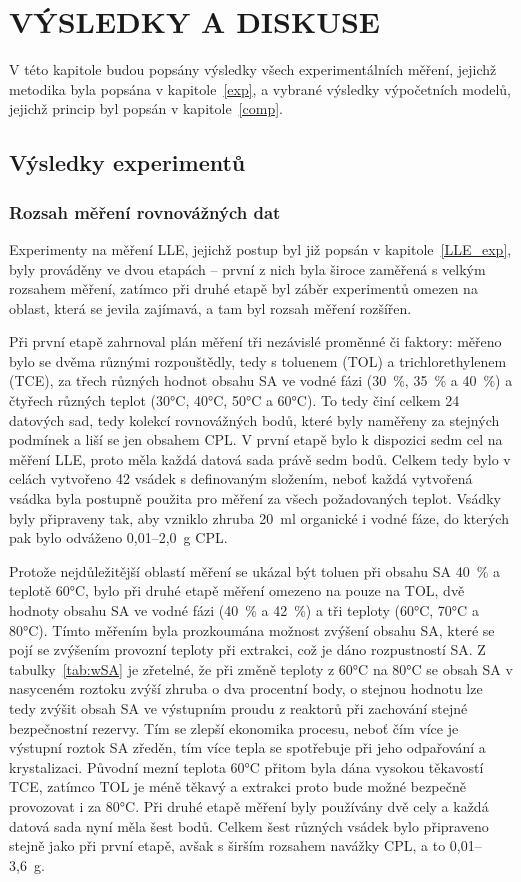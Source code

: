 
\newpage \section{VÝSLEDKY A DISKUSE} \label{res}
V této kapitole budou popsány výsledky všech experimentálních měření, jejichž metodika byla popsána v kapitole~\ref{exp}, a vybrané výsledky výpočetních modelů, jejichž princip byl popsán v kapitole~\ref{comp}.

\subsection{Výsledky experimentů} \label{resexp}

\subsubsection{Rozsah měření rovnovážných dat} \label{LLEscope}
Experimenty na měření LLE, jejichž postup byl již popsán v kapitole~\ref{LLE_exp}, byly prováděny ve dvou etapách -- první z nich byla široce zaměřená s velkým rozsahem měření, zatímco při druhé etapě byl záběr experimentů omezen na oblast, která se jevila zajímavá, a tam byl rozsah měření rozšířen.

Při první etapě zahrnoval plán měření tři nezávislé proměnné či faktory:
měřeno bylo se dvěma různými rozpouštědly, tedy s toluenem (TOL) a trichlorethylenem (TCE), za třech různých hodnot obsahu SA ve vodné fázi (30~\%, 35~\% a 40~\%) a čtyřech různých teplot (30°C, 40°C, 50°C a 60°C).
To tedy činí celkem 24 datových sad, tedy kolekcí rovnovážných bodů, které byly naměřeny za stejných podmínek a liší se jen obsahem CPL.
V první etapě bylo k dispozici sedm cel na měření LLE, proto měla každá datová sada právě sedm bodů.
Celkem tedy bylo v celách vytvořeno 42 vsádek s definovaným složením, neboť každá vytvořená vsádka byla postupně použita pro měření za všech požadovaných teplot.
Vsádky byly připraveny tak, aby vzniklo zhruba 20~ml organické i vodné fáze, do kterých pak bylo odváženo 0,01--2,0~g CPL.

Protože nejdůležitější oblastí měření se ukázal být toluen při obsahu SA 40~\% a teplotě 60°C, bylo při druhé etapě měření omezeno na pouze na TOL, dvě hodnoty obsahu SA ve vodné fázi (40~\% a 42~\%) a tři teploty (60°C, 70°C a 80°C).
Tímto měřením byla prozkoumána možnost zvýšení obsahu SA, které se pojí se zvýšením provozní teploty při extrakci, což je dáno rozpustností SA.
Z tabulky~\ref{tab:wSA} je zřetelné, že při změně teploty z 60°C na 80°C se obsah SA v nasyceném roztoku zvýší zhruba o dva procentní body, o stejnou hodnotu lze tedy zvýšit obsah SA ve výstupním proudu z reaktorů při zachování stejné bezpečnostní rezervy.
Tím se zlepší ekonomika procesu, neboť čím více je výstupní roztok SA zředěn, tím více tepla se spotřebuje při jeho odpařování a krystalizaci.
Původní mezní teplota 60°C přitom byla dána vysokou těkavostí TCE, zatímco TOL je méně těkavý a extrakci proto bude možné bezpečně provozovat i za 80°C.
Při druhé etapě měření byly používány dvě cely a každá datová sada nyní měla šest bodů.
Celkem šest různých vsádek bylo připraveno stejně jako při první etapě, avšak s širším rozsahem navážky CPL, a to 0,01--3,6~g.


